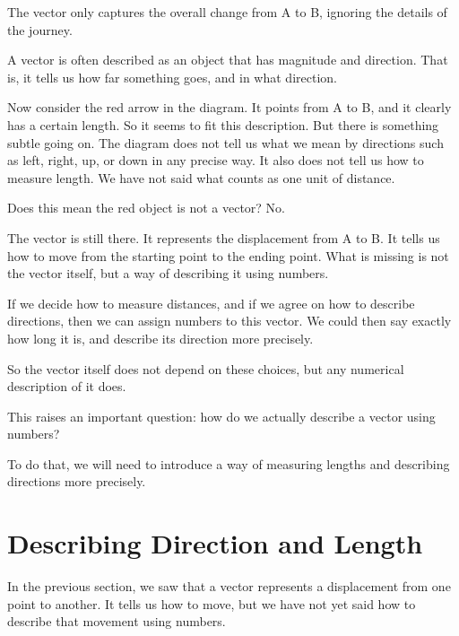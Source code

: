 \documentclass[11pt,openany]{book}
\theoremstyle{definition}
\begin{document}
\medskip

The vector only captures the overall change from A to B, ignoring the details of the journey.

\medskip

A vector is often described as an object that has magnitude and direction. That is, it tells us how far something goes, and in what direction.

\medskip

Now consider the red arrow in the diagram. It points from A to B, and it clearly has a certain length. 
So it seems to fit this description. But there is something subtle going on. The diagram does not tell us what we mean by directions such as left, right, up, or down in any precise way. 
It also does not tell us how to measure length. We have not said what counts as one unit of distance.

\medskip

Does this mean the red object is not a vector? No.

\medskip

The vector is still there. It represents the displacement from A to B. It tells us how to move from the starting point to the ending point. What is missing is not the vector itself, but a way of describing it using numbers.

\medskip

If we decide how to measure distances, and if we agree on how to describe directions, 
then we can assign numbers to this vector. We could then say exactly how long it is, 
and describe its direction more precisely.

\medskip

So the vector itself does not depend on these choices, but any numerical description of it does.

\medskip

This raises an important question: how do we actually describe a vector using numbers?

\medskip

To do that, we will need to introduce a way of measuring lengths and describing directions more precisely.

\section{Describing Direction and Length}

In the previous section, we saw that a vector represents a displacement from one point to another. 
It tells us how to move, but we have not yet said how to describe that movement using numbers.
\end{document}
